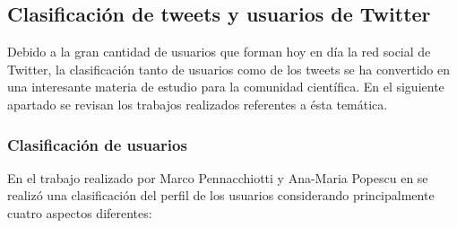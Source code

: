 \subsection{Clasificación de tweets y usuarios de Twitter}

Debido a la gran cantidad de usuarios que forman hoy en día la red social de Twitter, la clasificación tanto de 
usuarios como de los tweets se ha convertido en una interesante materia de estudio para la comunidad científica. 
En el siguiente apartado se revisan los trabajos realizados referentes a ésta temática.

\subsubsection{Clasificación de usuarios}
   
    En el trabajo realizado por Marco Pennacchiotti y Ana-Maria Popescu en \cite{PennacchiottiP11} se realizó una clasificación del perfil de los usuarios considerando principalmente cuatro aspectos diferentes:

